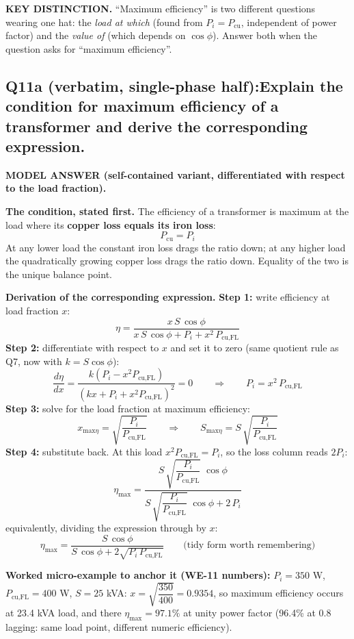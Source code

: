 \documentclass[11pt]{article}
\newcommand{\qhead}[2]{\subsection*{\color{copper}#1\quad\color{iron}#2}}
\newcommand{\tagline}[1]{\textbf{\color{copper}#1}}
\newcommand{\keydist}[1]{\vspace{2pt}\textbf{\color{red}KEY DISTINCTION.} #1}
\begin{document}
\keydist{``Maximum efficiency'' is two different questions wearing one hat: the \emph{load at which} (found from $P_i = P_{\text{cu}}$, independent of power factor) and the \emph{value of} (which depends on $\cos\phi$). Answer both when the question asks for ``maximum efficiency''.}

\qhead{Q11a (verbatim, single-phase half):}{Explain the condition for maximum efficiency of a transformer and derive the corresponding expression.}

\tagline{MODEL ANSWER (self-contained variant, differentiated with respect to the load fraction).}

\textbf{The condition, stated first.} The efficiency of a transformer is maximum at the load where its \textbf{copper loss equals its iron loss}:
\[
P_{\text{cu}} = P_i
\]
At any lower load the constant iron loss drags the ratio down; at any higher load the quadratically growing copper loss drags the ratio down. Equality of the two is the unique balance point.

\textbf{Derivation of the corresponding expression.}
\textbf{Step 1:} write efficiency at load fraction $x$:
\[
\eta = \frac{x\, S\, \cos\phi}{x\, S\, \cos\phi + P_i + x^{2}\, P_{\text{cu,FL}}}
\]
\textbf{Step 2:} differentiate with respect to $x$ and set it to zero (same quotient rule as Q7, now with $k = S\cos\phi$):
\[
\frac{d\eta}{dx} = \frac{k\left(P_i - x^{2} P_{\text{cu,FL}}\right)}{\left(k x + P_i + x^{2} P_{\text{cu,FL}}\right)^{2}} = 0
\qquad\Longrightarrow\qquad
P_i = x^{2}\, P_{\text{cu,FL}}
\]
\textbf{Step 3:} solve for the load fraction at maximum efficiency:
\[
x_{\text{max}\eta} = \sqrt{\frac{P_i}{P_{\text{cu,FL}}}}
\qquad\Longrightarrow\qquad
S_{\text{max}\eta} = S\,\sqrt{\frac{P_i}{P_{\text{cu,FL}}}}
\]
\textbf{Step 4:} substitute back. At this load $x^{2} P_{\text{cu,FL}} = P_i$, so the loss column reads $2 P_i$:
\[
\boxed{\;\eta_{\text{max}} = \frac{S\,\sqrt{\dfrac{P_i}{P_{\text{cu,FL}}}}\;\cos\phi}{S\,\sqrt{\dfrac{P_i}{P_{\text{cu,FL}}}}\;\cos\phi + 2\, P_i}\;}
\]
equivalently, dividing the expression through by $x$:
\[
\eta_{\text{max}} = \frac{S\,\cos\phi}{S\,\cos\phi + 2\sqrt{P_i\, P_{\text{cu,FL}}}}
\qquad\text{(tidy form worth remembering)}
\]

\textbf{Worked micro-example to anchor it (WE-11 numbers):} $P_i = 350$ W, $P_{\text{cu,FL}} = 400$ W, $S = 25$ kVA: $x = \sqrt{\dfrac{350}{400}} = 0.9354$, so maximum efficiency occurs at 23.4 kVA load, and there $\eta_{\text{max}} = 97.1\%$ at unity power factor (96.4\% at 0.8 lagging: same load point, different numeric efficiency).
\end{document}
